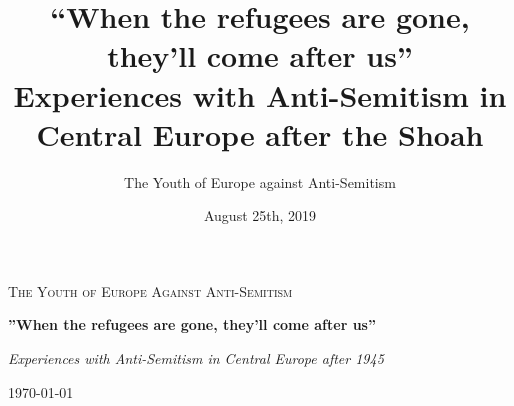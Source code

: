\documentclass{book}
\title{``When the refugees are gone, they'll come after us''\\ Experiences with Anti-Semitism in Central Europe after the Shoah}
\author{The Youth of Europe against Anti-Semitism}
\date{August 25th, 2019}
\newcommand{\blankpage}{
\newpage\thispagestyle{empty}
\mbox{}
\newpage
}
\begin{document}
	\setlength{\parindent}{0pt}
	\setlength{\parskip}{1em}
\begin{titlepage}
	\centering
	{\scshape\LARGE The Youth of Europe
	Against Anti-Semitism \par}
	\vspace{1cm}
	{\huge\bfseries''When the refugees are gone, they'll come after us'' \par}
	\vspace{2cm}
	{\Large\itshape Experiences with Anti-Semitism in Central Europe after 1945\par}
	\vfill
	{\large\today\par}
\end{titlepage}
\thispagestyle{empty}
\tableofcontents













 







\nocite{*}
\printbibliography

\blankpage
\blankpage
\end{document}
